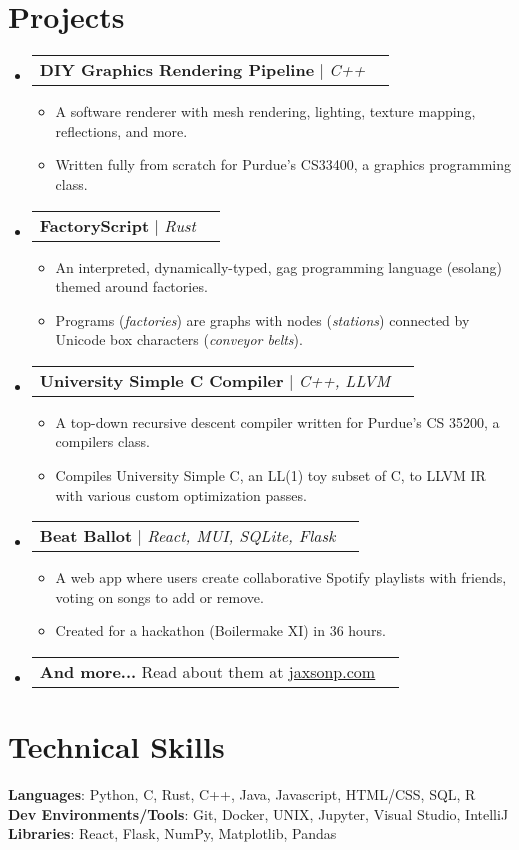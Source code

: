 \documentclass[letterpaper,11pt]{article}
\makeatletter
\newcommand{\resumeItem}[1]{
    \item\small{
        {#1 \vspace{-2pt}}
    }
}
\newcommand{\resumeProjectHeading}[1]{
    \item
    \begin{tabular*}{0.97\textwidth}{l@{\extracolsep{\fill}}r}
        \small#1 \\
    \end{tabular*}\vspace{-7pt}
}
\newcommand{\resumeSubHeadingListStart}{\begin{itemize}[leftmargin=0.15in, label={}]}
\newcommand{\resumeSubHeadingListEnd}{\end{itemize}}
\newcommand{\resumeItemListStart}{\begin{itemize}}
\newcommand{\resumeItemListEnd}{\end{itemize}\vspace{-5pt}}
\makeatother
\begin{document}
\section{Projects}
\resumeSubHeadingListStart
    \resumeProjectHeading
        {\textbf{DIY Graphics Rendering Pipeline} $|$ \emph{C++}}
        \resumeItemListStart
            \resumeItem{A software renderer with mesh rendering, lighting, texture mapping, reflections, and more.}
            \resumeItem{Written fully from scratch for Purdue's CS33400, a graphics programming class.}
        \resumeItemListEnd
    \resumeProjectHeading
        {\textbf{FactoryScript} $|$ \emph{Rust}}
        \resumeItemListStart
            \resumeItem{An interpreted, dynamically-typed, gag programming language  (esolang) themed around factories.}
            \resumeItem{Programs (\textit{factories}) are graphs with nodes (\textit{stations}) connected by Unicode box characters (\textit{conveyor belts}).}
        \resumeItemListEnd
    \resumeProjectHeading
        {\textbf{University Simple C Compiler} $|$ \emph{C++, LLVM}}
        \resumeItemListStart
            \resumeItem{A top-down recursive descent compiler written for Purdue's CS 35200, a compilers class.}
            \resumeItem{Compiles University Simple C, an LL(1) toy subset of C, to LLVM IR with various custom optimization passes.}
        \resumeItemListEnd
    \resumeProjectHeading
        {\textbf{Beat Ballot} $|$ \emph{React, MUI, SQLite, Flask}}
        \resumeItemListStart
            \resumeItem{A web app where users create collaborative Spotify playlists with friends, voting on songs to add or remove.}
            \resumeItem{Created for a hackathon (Boilermake XI) in 36 hours.}
        \resumeItemListEnd
    \resumeProjectHeading{\textbf{And more...} Read about them at \href{https://jaxsonp.com}{\underline{jaxsonp.com}}}
\resumeSubHeadingListEnd

%
\section{Technical Skills}
 \begin{itemize}[leftmargin=0.15in, label={}]
    \small{\item{
     \textbf{Languages}{: Python, C, Rust, C++, Java, Javascript, HTML/CSS, SQL, R} \\
     \textbf{Dev Environments/Tools}{: Git, Docker, UNIX, Jupyter, Visual Studio, IntelliJ } \\
     \textbf{Libraries}{: React, Flask, NumPy, Matplotlib, Pandas}
    }}
 \end{itemize}


\end{document}
